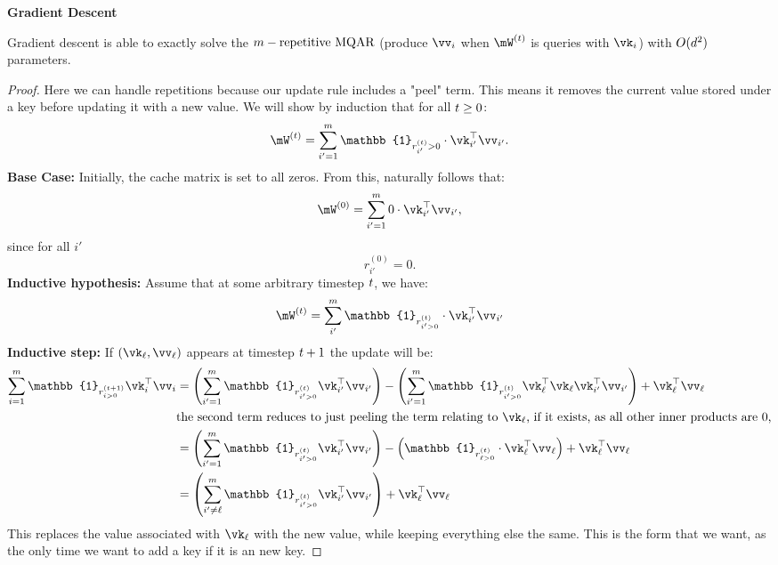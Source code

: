 \textbf{Gradient Descent}
\begin{theorem}
    Gradient descent is able to exactly solve the $m-\text{repetitive MQAR}$ (produce $\vv_{i}$ when $\mW^{(\timestep)}$ is queries with $\vk_{i}$) with  $O(d^2)$ parameters.
\end{theorem}
\begin{proof}
    Here we can handle repetitions because our update rule includes a "peel" term. This means it removes the current value stored under a key before updating it with a new value.
    We will show by induction that for all $t\ge 0$:
    \[
        \cacheMatrixTime{t} = \sum_{i'=1}^{\numPairs} \mathbb{1}_{r^{(t)}_{i'}>0} \cdot \vk_{i'}^{\top}\vv_{i'}.
    \]
    \textbf{Base Case:} Initially, the cache matrix is set to all zeros. From this, naturally follows that:
    \[
        \cacheMatrixTime{0} = \sum_{i'=1}^{\numPairs} 0 \cdot \vk_{i'}^{\top}\vv_{i'},
    \]
    since for all $i'$
    \[ r^{(0)}_{i'} = 0.\]
    \textbf{Inductive hypothesis:} Assume that at some arbitrary timestep $t$, we have:
    \[
        \cacheMatrixTime{t} = \sum_{i'}^{\numPairs} \mathbb{1}_{r^{(t)}_{i'>0}} \cdot \vk_{i'}^{\top}\vv_{i'}
    \]
    \textbf{Inductive step:}
    If $(\vk_{\ell}, \vv_{\ell})$ appears at timestep $t+1$ the update will be:
    \begin{align*}
        \sum_{i=1}^{\numPairs} \mathbb{1}_{r^{(t+1)}_{i>0}} \vk_{i}^{\top} \vv_{i} &= \left(\sum_{i'=1}^{\numPairs}\mathbb{1}_{r^{(t)}_{i'>0}} \vk_{i'}^{\top} \vv_{i'} \right) - \left( \sum_{i'=1}^{\numPairs}  \mathbb{1}_{r^{(t)}_{i'>0}} \vk_{\ell}^{\top}\vk_{\ell} \vk_{i'}^{\top} \vv_{i'} \right) + \vk_{\ell}^{\top} \vv_{\ell} \\
        &\text{the second term reduces to just peeling the term relating to $\vk_{\ell}$, if it exists, as all other inner products are $0$,} \\
        &= \left( \sum_{i'=1}^{\numPairs}\mathbb{1}_{r^{(t)}_{i'>0}} \vk_{i'}^{\top} \vv_{i'} \right) - \left(   \mathbb{1}_{r^{(t)}_{\ell>0}} \cdot  \vk_{\ell}^{\top} \vv_{\ell} \right) + \vk_{\ell}^{\top} \vv_{\ell} \\
        &= \left(\sum_{i'\neq \ell}^{\numPairs}\mathbb{1}_{r^{(t)}_{i'>0}} \vk_{i'}^{\top} \vv_{i'} \right) + \vk_{\ell}^{\top} \vv_{\ell} \\
    \end{align*}
    This replaces the value associated with $\vk_{\ell}$ with the new value, while keeping everything else the same. This is the form that we want, as the only time we want to add a key if it is an new key.

\end{proof}
